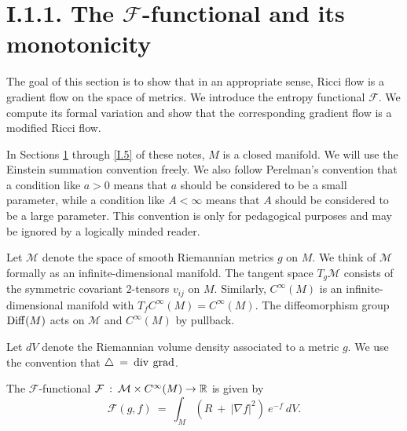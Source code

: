 \section{I.1.1. The ${\mathcal F}$-functional and its
monotonicity} \label{I.1.1}
\label{Derivation of first equation of Section 1.1}

The goal of this section is to show that in an appropriate sense, Ricci
flow is a gradient flow on the space of metrics.
We introduce the entropy functional ${\mathcal F}$.
We compute its formal variation and show that the corresponding
gradient flow is a modified Ricci flow.

In Sections \ref{I.1.1} through \ref{I.5} of these notes,  $M$
is a closed manifold.
We will use the Einstein summation convention freely. We also follow
Perelman's convention that a condition like $a > 0$ means that
$a$ should be considered to be a small parameter, while a condition
like $A < \infty$ means that $A$ should be considered to be a large
parameter. This convention is only for pedagogical purposes and
may be ignored by a logically minded reader.


Let ${\mathcal M}$ denote the space of smooth Riemannian metrics $g$ on
$M$. We think of ${\mathcal M}$ formally as an infinite-dimensional
manifold.  The tangent space $T_g {\mathcal M}$ consists of the
symmetric covariant $2$-tensors $v_{ij}$ on $M$. Similarly, $C^\infty(M)$
is an infinite-dimensional manifold with $T_f C^\infty(M) =
C^\infty(M)$.
The diffeomorphism group
$\operatorname{Diff}(M)$ acts on ${\mathcal M}$ and $C^\infty(M)$ by pullback.

Let $dV$ denote the Riemannian volume density associated to a metric $g$.
We use the convention that
$\triangle \: = \: \operatorname{div} \: \operatorname{grad}$.

\begin{definition}
  \label{def:kl-f-entropy-f-entropy-definition}

The ${\mathcal F}$-functional ${\mathcal F} \: : \: {\mathcal M} \times C^\infty(M)
\rightarrow {\mathbb R}$ is given by
\begin{equation}
{\mathcal F}(g, f) \: = \:
\int_M \left( R \: + \: |\nabla f|^2 \right) \: e^{-f} \: dV .
\end{equation}
\end{definition}

